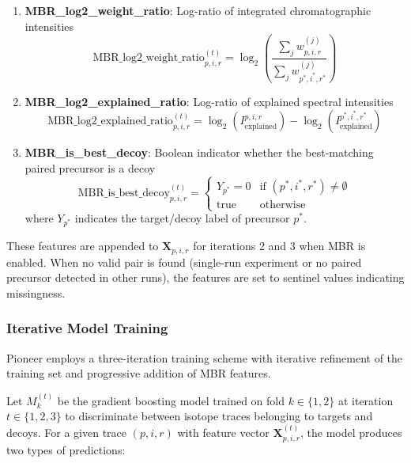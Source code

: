 \documentclass[pdflatex,sn-nature]{sn-jnl}
\begin{document}
\begin{enumerate}
\item \textbf{MBR\_log2\_weight\_ratio}: Log-ratio of integrated chromatographic intensities
\begin{equation}
    \text{MBR\_log2\_weight\_ratio}_{p,i,r}^{(t)} = \log_2\left(\frac{\sum_j w_{p,i,r}^{(j)}}{\sum_j w_{p^*,i^*,r^*}^{(j)}}\right)
\end{equation}

\item \textbf{MBR\_log2\_explained\_ratio}: Log-ratio of explained spectral intensities
\begin{equation}
    \text{MBR\_log2\_explained\_ratio}_{p,i,r}^{(t)} = \log_2(I_{\text{explained}}^{p,i,r}) - \log_2(I_{\text{explained}}^{p^*,i^*,r^*})
\end{equation}

\item \textbf{MBR\_is\_best\_decoy}: Boolean indicator whether the best-matching paired precursor is a decoy
\begin{equation}
    \text{MBR\_is\_best\_decoy}_{p,i,r}^{(t)} = \begin{cases}
        Y_{p^*} = 0 & \text{if } (p^*,i^*,r^*) \neq \emptyset \\
        \text{true} & \text{otherwise}
    \end{cases}
\end{equation}
where $Y_{p^*}$ indicates the target/decoy label of precursor $p^*$.
\end{enumerate}

These features are appended to $\mathbf{X}_{p,i,r}$ for iterations 2 and 3 when MBR is enabled. When no valid pair is found (single-run experiment or no paired precursor detected in other runs), the features are set to sentinel values indicating missingness.

\subsubsection{Iterative Model Training}

Pioneer employs a three-iteration training scheme with iterative refinement of the training set and progressive addition of MBR features.

Let $M_k^{(t)}$ be the gradient boosting model trained on fold $k \in \{1,2\}$ at iteration $t \in \{1,2,3\}$ to discriminate between isotope traces belonging to targets and decoys. For a given trace $(p,i,r)$ with feature vector $\mathbf{X}_{p,i,r}^{(t)}$, the model produces two types of predictions:
\end{document}
